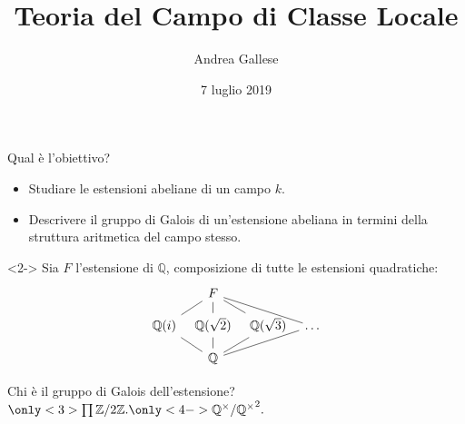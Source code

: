 \documentclass{beamer}
\title{Teoria del Campo di Classe Locale}
\author{Andrea Gallese}
\date{7 luglio 2019}
\newcommand{\Z}{\mathbb{Z}}
\newcommand{\Q}{\mathbb{Q}}
\newcommand{\Gal}[1]{\mathcal{G}al\left( #1 \right)}
\begin{document}
	\begin{frame}
	\titlepage
\end{frame}


\begin{frame}[fragile]{Qual è l'obiettivo?}

\begin{itemize}
	\item<1-> Studiare le estensioni abeliane di un campo {$k$}.
	\item<5-> Descrivere il gruppo di Galois di un'estensione abeliana in termini della struttura aritmetica del campo stesso.
\end{itemize}

\begin{example}<2->
	Sia $ F $ l'estensione di $ \Q $, composizione di tutte le estensioni quadratiche:
	\[\begin{tikzcd}[row sep = small, column sep = tiny]
	&F&& \\
	\Q(i) 		  \arrow[dash]{ur}  \arrow[dash]{dr}
	&\Q(\sqrt{2}) \arrow[dash]{u}   \arrow[dash]{d}
	&\Q(\sqrt{3}) \arrow[dash]{ul}  \arrow[dash]{dl}
	&\dots 		  \arrow[dash]{ull} \arrow[dash]{dll} \\
	&\Q&&	\end{tikzcd}  \]
	
	Chi è il gruppo di Galois dell'estensione? $\only<3>{\prod \Z/2\Z.} \only<4->{ \Q^\times/ {\Q^\times}^2.} $
\end{example}

\end{frame}
\end{document}
